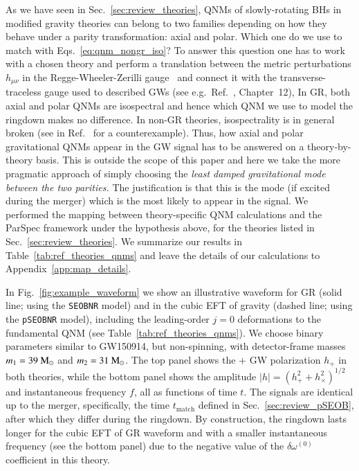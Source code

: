 \documentclass[twocolumn,
               prd,
               aps,
               superscriptaddress,
               tightenlines,
               nofootinbib,
               eqsecnum,
               amsfonts,
               amsmath,
               longbibliography]{revtex4-1}
\newcommand{\pSEOB}{\texttt{pSEOBNR}}
\newcommand{\msun}{~{\rm M}_{\odot}}
\begin{document}
As we have seen in Sec.~\ref{sec:review_theories}, QNMs of slowly-rotating
BHs in modified gravity theories can belong to two families depending on how
they behave under a parity transformation: axial and polar. Which one do
we use to match with Eqs.~\eqref{eq:qnm_nongr_iso}?
%
To answer this question one has to work with a chosen theory and perform a
translation between the metric perturbations $h_{\mu\nu}$ in the
Regge-Wheeler-Zerilli gauge~\cite{Regge:1957td,Zerilli:1970se} and connect it with the transverse-traceless gauge
used to described GWs (see e.g.~Ref.~\cite{Maggiore:2018sht}, Chapter~12),
%
In GR, both axial and polar QNMs are isospectral and hence which QNM we use to
model the ringdown makes no difference.
%
In non-GR theories, isospectrality is in general broken (see
in Ref.~\cite{Hui:2021cpm} for a counterexample).
%
Thus, how axial and polar gravitational QNMs appear in the GW signal has to be
answered on a theory-by-theory basis.
%
This is outside the scope of this paper and here we take the more pragmatic
approach of simply choosing the \emph{least damped gravitational mode between
the two parities.}
%
The justification is that this is the mode (if excited during the merger) which is
the most likely to appear in the signal.
We performed the mapping between theory-specific QNM calculations and the ParSpec framework
under the hypothesis above, for the theories listed in Sec.~\ref{sec:review_theories}.
%
We summarize our results in Table~\ref{tab:ref_theories_qnms} and
leave the details of our calculations to Appendix~\ref{app:map_details}.

In Fig.~\ref{fig:example_waveform} we show an illustrative waveform for GR (solid line; using the \texttt{SEOBNR} model) and in the cubic EFT of gravity (dashed line; using the \pSEOB{} model),
including the leading-order $j = 0$ deformations to the fundamental QNM (see Table~\ref{tab:ref_theories_qnms}).
%
We choose binary parameters similar to GW150914,  but non-spinning, with detector-frame masses
$m_1 = 39\msun$ and $m_2 = 31\msun$.
%
The top panel shows the $+$ GW polarization $h_{+}$ in both theories,
while the bottom panel shows the amplitude $|h| = (h_{+}^2 + h_{\times}^2)^{1/2}$
and instantaneous frequency $f$, all as functions of time $t$.
%
The signals are identical up to the merger, specifically, the time $t_\textrm{match}$
defined in Sec.~\ref{sec:review_pSEOB}, after which they differ during the ringdown.
%
By construction, the ringdown lasts longer for the cubic EFT of GR waveform and
with a smaller instantaneous frequency (see the bottom panel) due to the negative value of the
$\delta\omega^{(0)}$ coefficient in this theory.
\end{document}
